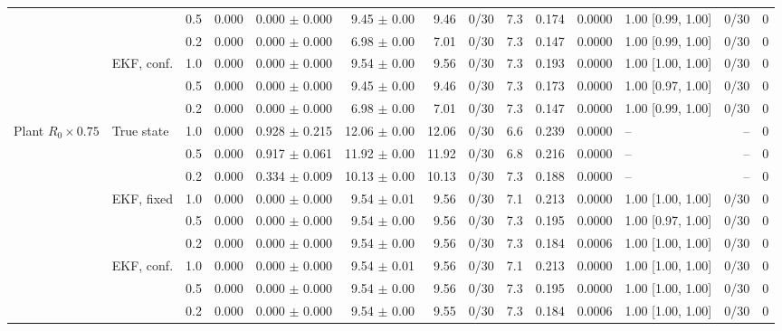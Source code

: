 {\begin{tabular}{llrrrrrrrrrlrr}
 &  & 0.5 & 0.000 & 0.000 $\pm$ 0.000 & 9.45 $\pm$ 0.00 & 9.46 & 0/30 & 7.3 & 0.174 & 0.0000 & 1.00 [0.99, 1.00] & 0/30 & 0 \\
 &  & 0.2 & 0.000 & 0.000 $\pm$ 0.000 & 6.98 $\pm$ 0.00 & 7.01 & 0/30 & 7.3 & 0.147 & 0.0000 & 1.00 [0.99, 1.00] & 0/30 & 0 \\
\addlinespace
 & EKF, conf. & 1.0 & 0.000 & 0.000 $\pm$ 0.000 & 9.54 $\pm$ 0.00 & 9.56 & 0/30 & 7.3 & 0.193 & 0.0000 & 1.00 [1.00, 1.00] & 0/30 & 0 \\
 &  & 0.5 & 0.000 & 0.000 $\pm$ 0.000 & 9.45 $\pm$ 0.00 & 9.46 & 0/30 & 7.3 & 0.173 & 0.0000 & 1.00 [0.97, 1.00] & 0/30 & 0 \\
 &  & 0.2 & 0.000 & 0.000 $\pm$ 0.000 & 6.98 $\pm$ 0.00 & 7.01 & 0/30 & 7.3 & 0.147 & 0.0000 & 1.00 [0.99, 1.00] & 0/30 & 0 \\
\midrule
Plant $R_0\times0.75$ & True state & 1.0 & 0.000 & 0.928 $\pm$ 0.215 & 12.06 $\pm$ 0.00 & 12.06 & 0/30 & 6.6 & 0.239 & 0.0000 & -- & -- & 0 \\
 &  & 0.5 & 0.000 & 0.917 $\pm$ 0.061 & 11.92 $\pm$ 0.00 & 11.92 & 0/30 & 6.8 & 0.216 & 0.0000 & -- & -- & 0 \\
 &  & 0.2 & 0.000 & 0.334 $\pm$ 0.009 & 10.13 $\pm$ 0.00 & 10.13 & 0/30 & 7.3 & 0.188 & 0.0000 & -- & -- & 0 \\
\addlinespace
 & EKF, fixed & 1.0 & 0.000 & 0.000 $\pm$ 0.000 & 9.54 $\pm$ 0.01 & 9.56 & 0/30 & 7.1 & 0.213 & 0.0000 & 1.00 [1.00, 1.00] & 0/30 & 0 \\
 &  & 0.5 & 0.000 & 0.000 $\pm$ 0.000 & 9.54 $\pm$ 0.00 & 9.56 & 0/30 & 7.3 & 0.195 & 0.0000 & 1.00 [0.97, 1.00] & 0/30 & 0 \\
 &  & 0.2 & 0.000 & 0.000 $\pm$ 0.000 & 9.54 $\pm$ 0.00 & 9.56 & 0/30 & 7.3 & 0.184 & 0.0006 & 1.00 [1.00, 1.00] & 0/30 & 0 \\
\addlinespace
 & EKF, conf. & 1.0 & 0.000 & 0.000 $\pm$ 0.000 & 9.54 $\pm$ 0.01 & 9.56 & 0/30 & 7.1 & 0.213 & 0.0000 & 1.00 [1.00, 1.00] & 0/30 & 0 \\
 &  & 0.5 & 0.000 & 0.000 $\pm$ 0.000 & 9.54 $\pm$ 0.00 & 9.56 & 0/30 & 7.3 & 0.195 & 0.0000 & 1.00 [1.00, 1.00] & 0/30 & 0 \\
 &  & 0.2 & 0.000 & 0.000 $\pm$ 0.000 & 9.54 $\pm$ 0.00 & 9.55 & 0/30 & 7.3 & 0.184 & 0.0006 & 1.00 [1.00, 1.00] & 0/30 & 0 \\
\bottomrule\end{tabular}}
